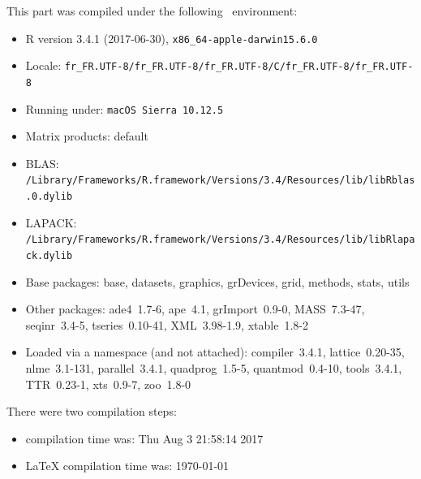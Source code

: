 \documentclass{article}
\begin{document}
\begin{scriptsize}

This part was compiled under the following \Rlogo{}~environment:

\begin{itemize}\raggedright
  \item R version 3.4.1 (2017-06-30), \verb|x86_64-apple-darwin15.6.0|
  \item Locale: \verb|fr_FR.UTF-8/fr_FR.UTF-8/fr_FR.UTF-8/C/fr_FR.UTF-8/fr_FR.UTF-8|
  \item Running under: \verb|macOS Sierra 10.12.5|
  \item Matrix products: default
  \item BLAS: \verb|/Library/Frameworks/R.framework/Versions/3.4/Resources/lib/libRblas.0.dylib|
  \item LAPACK: \verb|/Library/Frameworks/R.framework/Versions/3.4/Resources/lib/libRlapack.dylib|
  \item Base packages: base, datasets, graphics, grDevices, grid,
    methods, stats, utils
  \item Other packages: ade4~1.7-6, ape~4.1, grImport~0.9-0,
    MASS~7.3-47, seqinr~3.4-5, tseries~0.10-41, XML~3.98-1.9,
    xtable~1.8-2
  \item Loaded via a namespace (and not attached): compiler~3.4.1,
    lattice~0.20-35, nlme~3.1-131, parallel~3.4.1, quadprog~1.5-5,
    quantmod~0.4-10, tools~3.4.1, TTR~0.23-1, xts~0.9-7, zoo~1.8-0
\end{itemize}
There were two compilation steps:

\begin{itemize}
  \item \Rlogo{} compilation time was: Thu Aug  3 21:58:14 2017
  \item \LaTeX{} compilation time was: \today
\end{itemize}

\end{scriptsize}


\clearpage
{}


\end{document}

